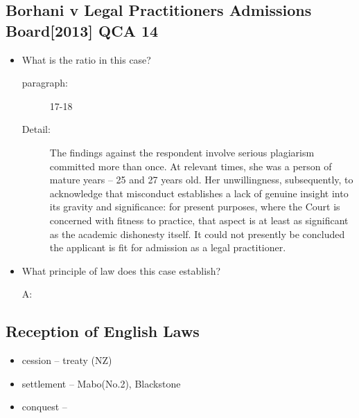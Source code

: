 \subsection*{Borhani v Legal Practitioners Admissions Board[2013] QCA 14}
\begin{itemize}

\item What is the ratio in this case?
        \begin{description}
            \item[paragraph:]17-18
            \item[Detail:]The findings against the respondent involve serious plagiarism committed more than once. At relevant times, she was a person of mature years – 25 and 27 years old. Her unwillingness, subsequently, to acknowledge that misconduct establishes a lack of genuine insight into its gravity and significance: for present purposes, where the Court is concerned with fitness to practice, that aspect is at least as significant as the academic dishonesty itself. It could not presently be concluded the applicant is fit for admission as a legal practitioner.
        \end{description}
        
    \item What principle of law does this case establish?
        \begin{description}
            \item[A:]
        \end{description}
\end{itemize}


\subsection*{Reception of English Laws}
\begin{itemize}
    \item cession -- treaty (NZ)
    \item settlement -- Mabo(No.2), Blackstone
    \item conquest -- 
\end{itemize}

